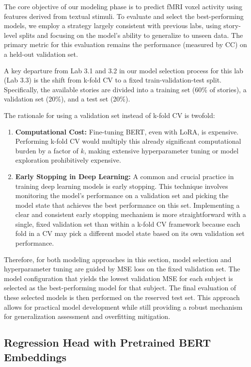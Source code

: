 \documentclass[10pt,letterpaper]{article}
\begin{document}
The core objective of our modeling phase is to predict fMRI voxel activity using features derived from textual stimuli. To evaluate and select the best-performing models, we employ a strategy largely consistent with previous labs, using story-level splits and focusing on the model's ability to generalize to unseen data. The primary metric for this evaluation remains the performance (measured by CC) on a held-out validation set.

A key departure from Lab 3.1 and 3.2 in our model selection process for this lab (Lab 3.3) is the shift from k-fold CV to a fixed train-validation-test split. Specifically, the available stories are divided into a training set (60\% of stories), a validation set (20\%), and a test set (20\%).

The rationale for using a validation set instead of k-fold CV is twofold:
\begin{enumerate}
    \item \textbf{Computational Cost:} Fine-tuning BERT, even with LoRA, is expensive. Performing k-fold CV would multiply this already significant computational burden by a factor of $k$, making extensive hyperparameter tuning or model exploration prohibitively expensive.
    \item \textbf{Early Stopping in Deep Learning:} A common and crucial practice in training deep learning models is early stopping. This technique involves monitoring the model's performance on a validation set and picking the model state that achieves the best performance on this set. Implementing a clear and consistent early stopping mechanism is more straightforward with a single, fixed validation set than within a k-fold CV framework because each fold in a CV may pick a different model state based on its own validation set performance.
\end{enumerate}

Therefore, for both modeling approaches in this section, model selection and hyperparameter tuning are guided by MSE loss on the fixed validation set. The model configuration that yields the lowest validation MSE for each subject is selected as the best-performing model for that subject. The final evaluation of these selected models is then performed on the reserved test set. This approach allows for practical model development while still providing a robust mechanism for generalization assessment and overfitting mitigation.

\subsection{Regression Head with Pretrained BERT Embeddings}
\end{document}
